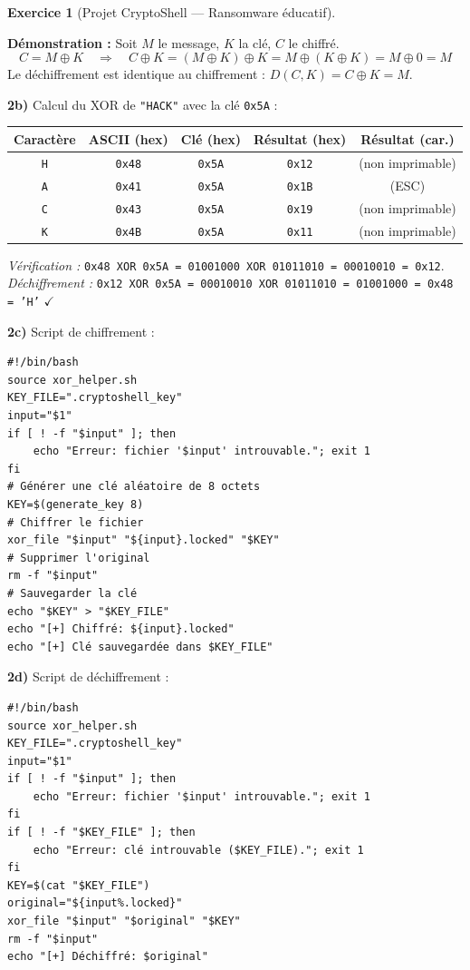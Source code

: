 \documentclass[a4paper,11pt]{article}
\theoremstyle{plain}
\theoremstyle{definition}
\newtheorem{exercice}{Exercice}
\begin{document}
\begin{exercice}[Projet CryptoShell --- Ransomware éducatif]
\begin{correction}
\textbf{Démonstration :} Soit $M$ le message, $K$ la clé, $C$ le chiffré.
\[C = M \oplus K \quad \Rightarrow \quad C \oplus K = (M \oplus K) \oplus K = M \oplus (K \oplus K) = M \oplus 0 = M\]
Le déchiffrement est identique au chiffrement : $D(C, K) = C \oplus K = M$.

\medskip
\textbf{2b)} Calcul du XOR de \texttt{"HACK"} avec la clé \texttt{0x5A} :

\begin{center}
\begin{tabular}{ccccc}
\toprule
\textbf{Caractère} & \textbf{ASCII (hex)} & \textbf{Clé (hex)} & \textbf{Résultat (hex)} & \textbf{Résultat (car.)} \\
\midrule
\texttt{H} & \texttt{0x48} & \texttt{0x5A} & \texttt{0x12} & (non imprimable) \\
\texttt{A} & \texttt{0x41} & \texttt{0x5A} & \texttt{0x1B} & (ESC) \\
\texttt{C} & \texttt{0x43} & \texttt{0x5A} & \texttt{0x19} & (non imprimable) \\
\texttt{K} & \texttt{0x4B} & \texttt{0x5A} & \texttt{0x11} & (non imprimable) \\
\bottomrule
\end{tabular}
\end{center}

\textit{Vérification :} \texttt{0x48 XOR 0x5A = 01001000 XOR 01011010 = 00010010 = 0x12}. \\
\textit{Déchiffrement :} \texttt{0x12 XOR 0x5A = 00010010 XOR 01011010 = 01001000 = 0x48 = 'H'} $\checkmark$

\medskip
\textbf{2c)} Script de chiffrement :
\begin{lstlisting}[title=encrypt.sh]
#!/bin/bash
source xor_helper.sh
KEY_FILE=".cryptoshell_key"
input="$1"
if [ ! -f "$input" ]; then
    echo "Erreur: fichier '$input' introuvable."; exit 1
fi
# Générer une clé aléatoire de 8 octets
KEY=$(generate_key 8)
# Chiffrer le fichier
xor_file "$input" "${input}.locked" "$KEY"
# Supprimer l'original
rm -f "$input"
# Sauvegarder la clé
echo "$KEY" > "$KEY_FILE"
echo "[+] Chiffré: ${input}.locked"
echo "[+] Clé sauvegardée dans $KEY_FILE"
\end{lstlisting}

\textbf{2d)} Script de déchiffrement :
\begin{lstlisting}[title=decrypt.sh]
#!/bin/bash
source xor_helper.sh
KEY_FILE=".cryptoshell_key"
input="$1"
if [ ! -f "$input" ]; then
    echo "Erreur: fichier '$input' introuvable."; exit 1
fi
if [ ! -f "$KEY_FILE" ]; then
    echo "Erreur: clé introuvable ($KEY_FILE)."; exit 1
fi
KEY=$(cat "$KEY_FILE")
original="${input%.locked}"
xor_file "$input" "$original" "$KEY"
rm -f "$input"
echo "[+] Déchiffré: $original"
\end{lstlisting}


\end{correction}
\end{exercice}
\end{document}
